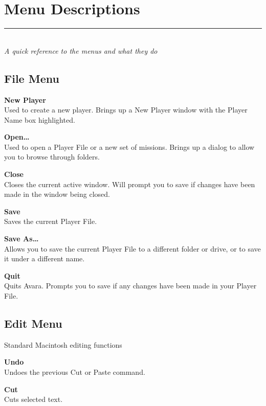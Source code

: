 \documentclass{article}
\let\oldsection\section
\renewcommand\section{\clearpage\oldsection}
\begin{document}
\section{Menu Descriptions}
\rule{5.5cm}{.15pt}\\
\rmfamily\textit{A quick reference to the menus and what they do}

\subsection{File Menu}
\textbf{New Player\hspace{1em}}\\
Used to create a new player. Brings up a New Player window with the Player Name box highlighted.

\textbf{Open\dots\hspace{1em}}\\
Used to open a Player File or a new set of missions. Brings up a dialog to allow you to browse through folders.

\textbf{Close\hspace{1em}}\\
Closes the current active window. Will prompt you to save if changes have been made in the window being closed.

\textbf{Save\hspace{1em}}\\
Saves the current Player File.

\textbf{Save As\dots}\\
Allows you to save the current Player File to a different folder or drive, or to save it under a different name.

\textbf{Quit\hspace{1em}}\\
Quits Avara. Prompts you to save if any changes have been made in your Player File.

\subsection{Edit Menu}
Standard Macintosh editing functions

\textbf{Undo\hspace{1em}}\\
Undoes the previous Cut or Paste command.

\textbf{Cut\hspace{1em}}\\
Cuts selected text.
\end{document}
